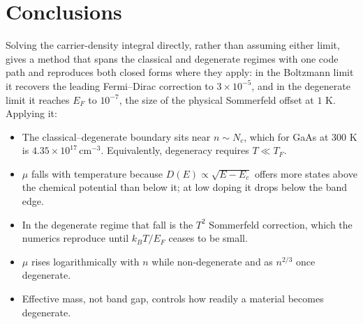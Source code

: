\documentclass[aps,prb,reprint,nofootinbib]{revtex4-2}
\begin{document}
\section{Conclusions}

Solving the carrier-density integral directly, rather than assuming either limit, gives a method
that spans the classical and degenerate regimes with one code path and reproduces both closed
forms where they apply: in the Boltzmann limit it recovers the leading Fermi--Dirac correction
to $3\times10^{-5}$, and in the degenerate limit it reaches $E_F$ to $10^{-7}$, the size of the
physical Sommerfeld offset at $1$ K. Applying it:

\begin{itemize}
  \item The classical--degenerate boundary sits near $n \sim N_c$, which for GaAs at $300$ K is
        $4.35\times10^{17}\,$cm$^{-3}$. Equivalently, degeneracy requires $T \ll T_F$.
  \item $\mu$ falls with temperature because $D(E)\propto\sqrt{E-E_c}$ offers more states above
        the chemical potential than below it; at low doping it drops below the band edge.
  \item In the degenerate regime that fall is the $T^2$ Sommerfeld correction, which the
        numerics reproduce until $k_BT/E_F$ ceases to be small.
  \item $\mu$ rises logarithmically with $n$ while non-degenerate and as $n^{2/3}$ once
        degenerate.
  \item Effective mass, not band gap, controls how readily a material becomes degenerate.
\end{itemize}
\end{document}
